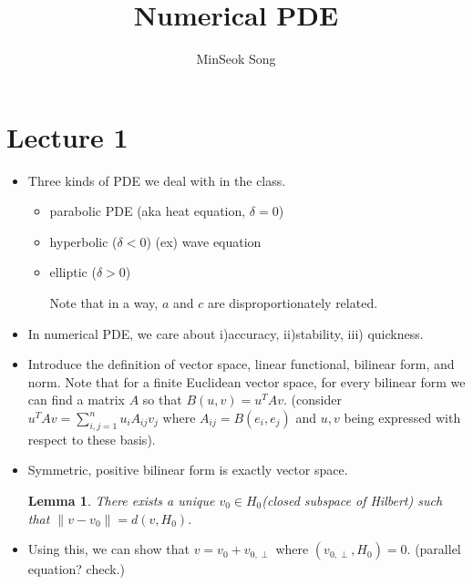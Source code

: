\documentclass{article}
\title{Numerical PDE}
\author{MinSeok Song}
\date{}
\newtheorem{lemma}[theorem]{Lemma}
\theoremstyle{remark}
\begin{document}
\maketitle 
\section*{Lecture 1}
\begin{itemize}
\item Three kinds of PDE we deal with in the class.
\begin{itemize}
\item parabolic PDE (aka heat equation, $\delta=0$)
\item hyperbolic ($\delta<0$) (ex) wave equation
\item elliptic ($\delta>0$)

Note that in a way, $a$ and $c$ are disproportionately related.
\end{itemize}
\item In numerical PDE, we care about i)accuracy, ii)stability, iii) quickness.

\item Introduce the definition of vector space, linear functional, bilinear form, and norm. 
Note that for a finite Euclidean vector space, for every bilinear form we can find a matrix $A$ so that $B(u,v)=u^TAv$. (consider $u^TAv=\sum^n_{i,j=1}u_iA_{ij}v_j$ where $A_{ij}=B(e_i,e_j)$ and $u,v$ being expressed with respect to these basis).

\item Symmetric, positive bilinear form is exactly vector space.
\begin{lemma}
There exists a unique $v_0\in H_0$(closed subspace of Hilbert) such that $\lVert v-v_0\rVert=d(v,H_0)$.
\end{lemma}

\item Using this, we can show that $v=v_0+v_{0,\perp}$ where $(v_{0,\perp},H_0)=0$.
(parallel equation? check.)

\end{itemize}
\end{document}
